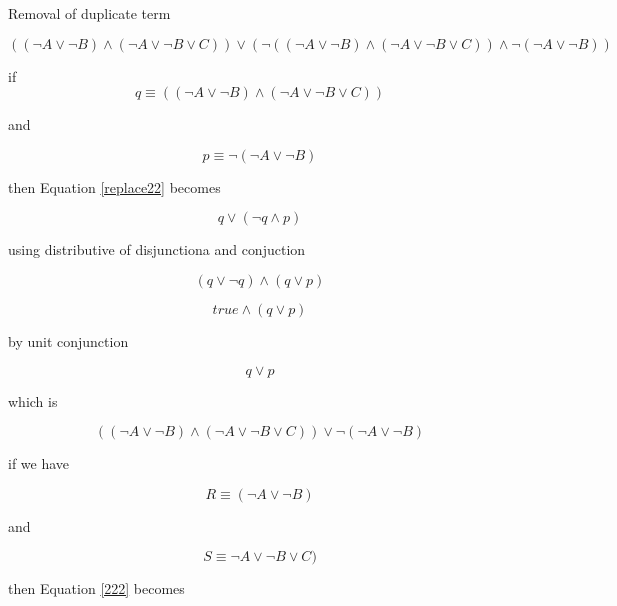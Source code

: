 \documentclass[10pt,a4paper]{article}
\begin{document}
Removal of duplicate term

\begin{equation}
 ((\neg A \vee \neg B) \wedge(\neg A\vee\neg B\vee C)) \vee (\neg ((\neg A\vee \neg B)\wedge(\neg A\vee\neg B\vee C))\wedge\neg(\neg A\vee \neg B))
 \label{replace22}
\end{equation}

if 
\begin{equation}
 q \equiv ((\neg A \vee \neg B) \wedge(\neg A\vee\neg B\vee C)) 
\end{equation}

and 

\begin{equation}
 p \equiv \neg(\neg A\vee \neg B)
\end{equation}

then Equation \ref{replace22} becomes

\begin{equation}
 q \vee (\neg q \wedge p)
\end{equation}

using distributive of disjunctiona and conjuction

\begin{equation}
 (q \vee \neg q)\wedge (q\vee p)
\end{equation}


\begin{equation}
 true \wedge (q\vee p)
\end{equation}

by unit conjunction

\begin{equation}
 q\vee p
\end{equation}

which is 

\begin{equation}
 ((\neg A \vee \neg B) \wedge(\neg A\vee\neg B\vee C)) \vee \neg(\neg A\vee \neg B)
\label{222}
\end{equation}

if we have

\begin{equation}
 R \equiv (\neg A \vee \neg B)
\end{equation}

and

\begin{equation}
 S \equiv \neg A\vee\neg B\vee C)
\end{equation}

then Equation \ref{222} becomes
\end{document}

